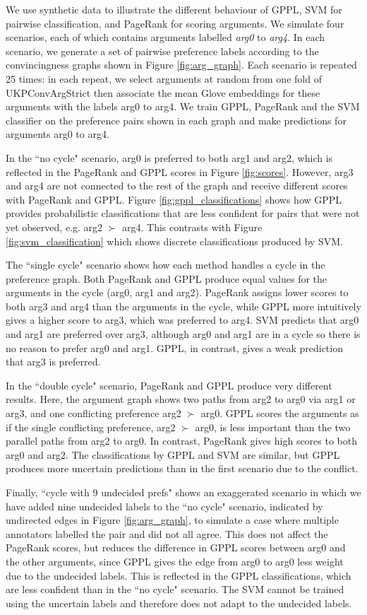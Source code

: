 We use synthetic data to illustrate the different behaviour of GPPL, SVM for pairwise classification,
and PageRank for scoring arguments.
We simulate four scenarios, each of which contains arguments labelled \emph{arg0} to \emph{arg4}.  
In each scenario, we generate a set of pairwise preference labels according to the 
convincingness graphs shown in Figure \ref{fig:arg_graph}.
Each scenario is repeated 25 times: in each repeat, we select arguments at random from one fold of UKPConvArgStrict
then associate the mean Glove embeddings for these arguments with the labels arg0 to arg4. 
We train GPPL, PageRank and the SVM classifier on the preference pairs shown in each graph and
make predictions for arguments arg0 to arg4.

In the  ``no cycle" scenario, 
arg0 is preferred to both arg1 and arg2, which is reflected in the PageRank and GPPL scores in Figure \ref{fig:scores}. However, arg3 and arg4 are not connected to the rest of the graph and receive different scores with PageRank and GPPL. 
Figure \ref{fig:gppl_classifications} shows how GPPL provides probabilistic classifications that are less confident for pairs that were not yet observed, e.g. arg2 $\succ$ arg4. This contrasts with Figure \ref{fig:svm_classification} which shows discrete classifications produced by SVM.

The ``single cycle" scenario shows how each method handles a cycle in the preference graph.
Both PageRank and GPPL produce equal values for the arguments in the cycle (arg0, arg1 and arg2). PageRank assigns lower scores to both arg3 and arg4 than the arguments in the cycle, 
while GPPL more intuitively gives a higher score to arg3, which was preferred to arg4. 
SVM predicts that arg0 and arg1 are preferred over arg3, 
although arg0 and arg1 are in a cycle so there is no reason to prefer arg0 and arg1. 
GPPL, in contrast, gives a weak prediction that arg3 is preferred.

In the ``double cycle" scenario, PageRank and GPPL produce very different results.
Here, the argument graph shows two paths from arg2 to arg0 via arg1 or arg3, and one conflicting
preference arg2 $\succ$ arg0. 
GPPL scores the arguments as if the single conflicting preference, arg2 $\succ$ arg0, 
is less important than the two parallel paths from arg2 to arg0. 
In contrast, PageRank gives high scores to both arg0 and arg2.
The classifications by GPPL and SVM are similar, but GPPL produces more uncertain 
predictions than in the first scenario due to the conflict.

Finally, ``cycle with 9 undecided prefs" shows an exaggerated scenario in which
we have added nine undecided labels to the ``no cycle" scenario, indicated by 
undirected edges in Figure \ref{fig:arg_graph}, to simulate a case where multiple annotators labelled the pair 
and did not all agree. 
This does not affect the PageRank scores, 
but reduces the difference in GPPL scores between arg0 and the other arguments, 
since GPPL gives the edge from arg0 to arg0 less weight due to the undecided labels. 
This is reflected in the GPPL classifications, which are less confident than in the ``no cycle" scenario.
The SVM cannot be trained using the uncertain labels and therefore does not adapt to the undecided labels. 

